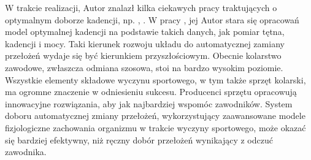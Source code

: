 W trakcie realizacji, Autor znalazł kilka ciekawych pracy traktujących o optymalnym doborze kadencji, np. \cite{phd}, \cite{iain}. W pracy \cite{phd}, jej Autor stara się opracowań model optymalnej kadencji na podstawie takich danych, jak pomiar tętna, kadencji i mocy. Taki kierunek rozwoju układu do automatycznej zamiany przełożeń wydaje się być kierunkiem przyszłościowym. Obecnie kolarstwo zawodowe, zwłaszcza odmiana szosowa, stoi na bardzo wysokim poziomie. Wszystkie elementy składowe wyczynu sportowego, w tym także sprzęt kolarski, ma ogromne znaczenie w odniesieniu sukcesu. Producenci sprzętu opracowują innowacyjne rozwiązania, aby jak najbardziej wspomóc zawodników. System doboru automatycznej zmiany przełożeń, wykorzystujący zaawansowane modele fizjologiczne zachowania organizmu w trakcie wyczyny sportowego, może okazać się bardziej efektywny, niż ręczny dobór przełożeń wynikający z odczuć zawodnika.   

